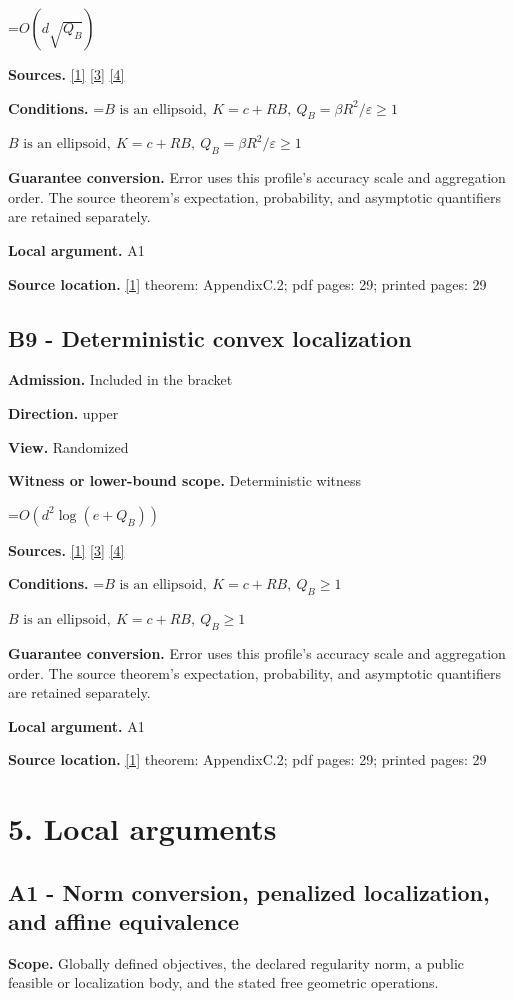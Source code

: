 \documentclass[10pt,a4paper]{article}
\newcommand{\AtlasMath}[1]{\par\begingroup\centering\setbox0=\hbox{$\displaystyle #1$}\ifdim\wd0>1.4\linewidth\typeout{ATLAS WIDE FORMULA: \the\wd0}\fi\ifdim\wd0>\linewidth\resizebox{\linewidth}{!}{\box0}\else\box0\fi\par\endgroup}
\newcommand{\AtlasInlineMath}[1]{\begingroup\setbox0=\hbox{$#1$}\ifdim\wd0>.4\linewidth\endgroup\AtlasMath{#1}\else\endgroup$#1$\fi}
\begin{document}
\AtlasMath{O(d\sqrt{Q_B})}
\textbf{Sources.} \href{https://arxiv.org/html/2610.00345v1}{[1]} \href{https://arxiv.org/html/2607.16558v2}{[3]} \href{https://www.mathnet.ru/php/archive.phtml?jrnid=mzm&option_lang=eng&paperid=1697&wshow=paper}{[4]}

\textbf{Conditions.} \AtlasInlineMath{B\text{ is an ellipsoid},\ K=c+RB,\ Q_B=\beta R^2/\varepsilon\ge1}

\textbf{Guarantee conversion.} Error uses this profile's accuracy scale and aggregation order. The source theorem's expectation, probability, and asymptotic quantifiers are retained separately.

\textbf{Local argument.} A1

\textbf{Source location.} \href{https://arxiv.org/html/2610.00345v1}{[1]} theorem: AppendixC.2; pdf pages: 29; printed pages: 29

\subsection{B9 - Deterministic convex localization}
\textbf{Admission.} Included in the bracket

\textbf{Direction.} upper

\textbf{View.} Randomized

\textbf{Witness or lower-bound scope.} Deterministic witness

\AtlasMath{O(d^2\log(e+Q_B))}
\textbf{Sources.} \href{https://arxiv.org/html/2610.00345v1}{[1]} \href{https://arxiv.org/html/2607.16558v2}{[3]} \href{https://www.mathnet.ru/php/archive.phtml?jrnid=mzm&option_lang=eng&paperid=1697&wshow=paper}{[4]}

\textbf{Conditions.} \AtlasInlineMath{B\text{ is an ellipsoid},\ K=c+RB,\ Q_B\ge1}

\textbf{Guarantee conversion.} Error uses this profile's accuracy scale and aggregation order. The source theorem's expectation, probability, and asymptotic quantifiers are retained separately.

\textbf{Local argument.} A1

\textbf{Source location.} \href{https://arxiv.org/html/2610.00345v1}{[1]} theorem: AppendixC.2; pdf pages: 29; printed pages: 29

\section{5. Local arguments}
\subsection{A1 - Norm conversion, penalized localization, and affine equivalence}
\textbf{Scope.} Globally defined objectives, the declared regularity norm, a public feasible or localization body, and the stated free geometric operations.
\end{document}
